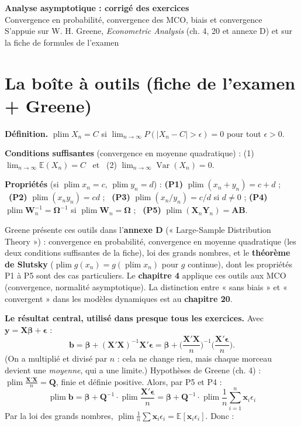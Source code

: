 \documentclass[11pt,a4paper]{article}
\newcommand{\vy}{\mathbf{y}}\newcommand{\vX}{\mathbf{X}}\newcommand{\vb}{\mathbf{b}}\newcommand{\vx}{\mathbf{x}}
\newcommand{\vbeta}{\bm{\beta}}\newcommand{\veps}{\bm{\epsilon}}\newcommand{\Q}{\mathbf{Q}}
\newcommand{\E}{\mathbb{E}}\newcommand{\Var}{\operatorname{Var}}\newcommand{\Cov}{\operatorname{Cov}}
\newcommand{\plim}{\operatorname{plim}}
\newcommand{\sumi}{\sum_{i=1}^{n}}
\begin{document}
\begin{center}
{\LARGE\bfseries Analyse asymptotique : corrigé des exercices}\\[6pt]
{\large Convergence en probabilité, convergence des MCO, biais et convergence}\\[4pt]
{\small S'appuie sur W. H. Greene, \emph{Econometric Analysis} (ch. 4, 20 et annexe D) et sur la fiche de formules de l'examen}
\end{center}

\tableofcontents

\section*{La boîte à outils (fiche de l'examen + Greene)}

\begin{fiche}[title={La fiche de formules du professeur}]
\textbf{Définition.} $\plim X_n=C$ si $\lim_{n\to\infty}P(|X_n-C|>\epsilon)=0$ pour tout $\epsilon>0$.

\textbf{Conditions suffisantes} (convergence en moyenne quadratique) : (1) $\lim_{n\to\infty}\E(X_n)=C$ \ et \ (2) $\lim_{n\to\infty}\Var(X_n)=0$.

\textbf{Propriétés} (si $\plim x_n=c$, $\plim y_n=d$) :
\textbf{(P1)} $\plim(x_n+y_n)=c+d$ ; \ \textbf{(P2)} $\plim(x_ny_n)=cd$ ; \ \textbf{(P3)} $\plim(x_n/y_n)=c/d$ si $d\neq0$ ;
\textbf{(P4)} $\plim\mathbf W_n^{-1}=\bm\Omega^{-1}$ si $\plim\mathbf W_n=\bm\Omega$ ; \ \textbf{(P5)} $\plim(\mathbf X_n\mathbf Y_n)=\mathbf{AB}$.
\end{fiche}

\begin{greene}
Greene présente ces outils dans l'\textbf{annexe D} (« Large-Sample Distribution Theory ») : convergence en probabilité, convergence en moyenne quadratique (les deux conditions suffisantes de la fiche), loi des grands nombres, et le \textbf{théorème de Slutsky} ($\plim g(x_n)=g(\plim x_n)$ pour $g$ continue), dont les propriétés P1 à P5 sont des cas particuliers. Le \textbf{chapitre 4} applique ces outils aux MCO (convergence, normalité asymptotique). La distinction entre « sans biais » et « convergent » dans les modèles dynamiques est au \textbf{chapitre 20}.
\end{greene}

\textbf{Le résultat central, utilisé dans presque tous les exercices.} Avec $\vy=\vX\vbeta+\veps$ :
\[
\vb=\vbeta+(\vX'\vX)^{-1}\vX'\veps=\vbeta+\Big(\frac{\vX'\vX}{n}\Big)^{-1}\Big(\frac{\vX'\veps}{n}\Big).
\]
(On a multiplié et divisé par $n$ : cela ne change rien, mais chaque morceau devient une \emph{moyenne}, qui a une limite.) Hypothèses de Greene (ch. 4) : $\plim\frac{\vX'\vX}{n}=\Q$, finie et définie positive. Alors, par P5 et P4 :
\[
\boxed{\ \plim\vb=\vbeta+\Q^{-1}\cdot\plim\frac{\vX'\veps}{n}=\vbeta+\Q^{-1}\cdot\plim\frac1n\sumi\vx_i\epsilon_i\ }
\]
Par la loi des grands nombres, $\plim\frac1n\sum\vx_i\epsilon_i=\E[\vx_i\epsilon_i]$. Donc :
\end{document}
